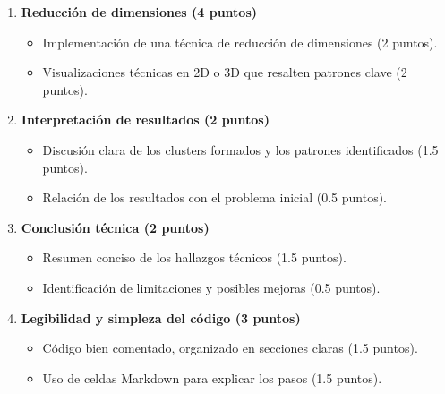 \documentclass[a4,11pt]{aleph-notas}
\begin{document}
\begin{enumerate}[leftmargin=*,label=\textbf{\arabic*.}]
    \item \textbf{Reducción de dimensiones (4 puntos)}
    \begin{itemize}[leftmargin=*]
        \item Implementación de una técnica de reducción de dimensiones (2 puntos).
        \item Visualizaciones técnicas en 2D o 3D que resalten patrones clave (2 puntos).
    \end{itemize}

    \item \textbf{Interpretación de resultados (2 puntos)}
    \begin{itemize}[leftmargin=*]
        \item Discusión clara de los clusters formados y los patrones identificados (1.5 puntos).
        \item Relación de los resultados con el problema inicial (0.5 puntos).
    \end{itemize}

    \item \textbf{Conclusión técnica (2 puntos)}
    \begin{itemize}[leftmargin=*]
        \item Resumen conciso de los hallazgos técnicos (1.5 puntos).
        \item Identificación de limitaciones y posibles mejoras (0.5 puntos).
    \end{itemize}

    \item \textbf{Legibilidad y simpleza del código (3 puntos)}
    \begin{itemize}[leftmargin=*]
        \item Código bien comentado, organizado en secciones claras (1.5 puntos).
        \item Uso de celdas Markdown para explicar los pasos (1.5 puntos).
    \end{itemize}
\end{enumerate}
\end{document}
